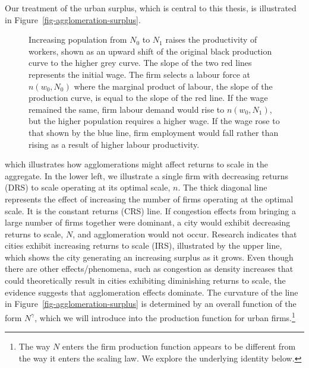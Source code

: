 Our treatment of the urban surplus, which is central to this thesis, is illustrated in Figure~\ref{fig-agglomeration-surplus}. 
\begin{figure}[htb]
    \centering

    \caption[Increasing population raises the productivity of workers]{Increasing population from $N_0$ to $N_1$ raises the productivity of workers, shown as an upward shift of the original black production curve to the higher grey curve. The slope of the two red lines represents the initial wage. The firm selects a labour force at $n(w_0, N_0)$ where the marginal product of labour, the slope of the production curve, is equal to the slope of the red line. If the wage remained the same, firm labour demand would rise to $n(w_0, N_1)$, but the higher population requires a higher wage. If the wage rose to that  shown by the blue line, firm employment would fall rather than rising as a result of higher labour productivity.}
    \label{fig-wage-workforce-effects} %
\end{figure}
which illustrates how agglomerations might affect returns to scale in the aggregate.
In the lower left, we illustrate a single firm with decreasing returns (DRS) to scale operating at its optimal scale, $n$. The thick diagonal line represents the effect of increasing the number of firms operating at the optimal scale. It is the constant returns (CRS) line. If congestion effects from bringing a large number of firms together were dominant, a city would exhibit decreasing returns to scale,  $N$, and agglomeration would not occur. Research indicates that cities exhibit increasing returns to scale (IRS), illustrated by the upper line, which shows the city generating an increasing surplus as it grows. Even though there are other effects/phenomena, such as congestion as density increases that could theoretically result in cities exhibiting diminishing returns to scale, the evidence suggests that agglomeration effects dominate. The curvature of the line in Figure~\ref{fig-agglomeration-surplus} is determined by an overall  function of the form $N^\gamma$, which we will introduce into the production function for urban firms.\footnote{The way $N$ enters the firm production function appears to be different from the way it enters the scaling law. We explore the underlying identity below.} 

